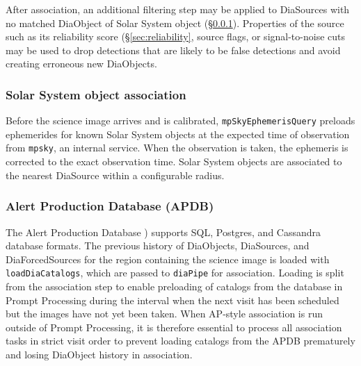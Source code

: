 After association, an additional filtering step may be applied to DiaSources with no matched DiaObject of Solar System object (\S\ref{sec:solar}).
Properties of the source such as its reliability score (\S\ref{sec:reliability}, source flags, or signal-to-noise cuts may be used to drop detections that are likely to be false detections and avoid creating erroneous new DiaObjects.

\subsubsection{Solar System object association}
\label{sec:solar}

Before the science image arrives and is calibrated, \texttt{mpSkyEphemerisQuery} preloads ephemerides for known Solar System objects at the expected time of observation from \texttt{mpsky}, an internal service.
When the observation is taken, the ephemeris is corrected to the exact observation time.
Solar System objects are associated to the nearest DiaSource within a configurable radius.

\subsubsection{Alert Production Database (APDB)}
\label{sec:apdb}

The Alert Production Database \citep[APDB;][]{DMTN-293}) supports SQL, Postgres, and Cassandra database formats.
The previous history of DiaObjects, DiaSources, and DiaForcedSources for the region containing the science image is loaded with \texttt{loadDiaCatalogs}, which are passed to \texttt{diaPipe} for association.
Loading is split from the association step to enable preloading of catalogs from the database in Prompt Processing during the interval when the next visit has been scheduled but the images have not yet been taken.
When AP-style association is run outside of Prompt Processing, it is therefore essential to process all association tasks in strict visit order to prevent loading catalogs from the APDB prematurely and losing DiaObject history in association.
